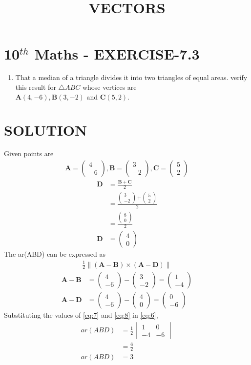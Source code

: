 \documentclass[12pt]{article}
\newcommand{\mydet}[1]{\ensuremath{\begin{vmatrix}#1\end{vmatrix}}}
\providecommand{\brak}[1]{\ensuremath{\left(#1\right)}}
\newcommand{\myvec}[1]{\ensuremath{\begin{pmatrix}#1\end{pmatrix}}}
\providecommand{\norm}[1]{\left\lVert#1\right\rVert}
\let\vec\mathbf
\begin{document}
\begin{center}
\title{\textbf{VECTORS}}
\date{\vspace{-5ex}} %
\maketitle
\end{center}

\section{10$^{th}$ Maths - EXERCISE-7.3}

\begin{enumerate}
\item That a median of a triangle divides it into two triangles  of equal areas. verify this result for $\triangle ABC$ whose vertices are $\vec{A}(4,-6),\vec{B}(3,-2)\text{ and }\vec{C}(5,2)$.
\end{enumerate}

\section{SOLUTION}
Given points are
\begin{align}
\vec{A}=\myvec{4\\ -6} ,
\vec{B}=\myvec{3\\ -2} ,
\vec{C}=\myvec{5\\ 2}
\end{align}
\begin{align}
\vec{D}&=\frac{\vec{B}+\vec{C}}{2}\\
&=\frac{\myvec{3\\ -2}+\myvec{5\\ 2}}{2}\\
&=\frac{\myvec{8\\ 0}}{2}\\
\vec{D}&=\myvec{4\\ 0}
\end{align}
The ar(ABD) can be expressed as
 \begin{align}
  \frac{1}{2} \norm{\brak{\vec{A}-\vec{B}}  \times 
   \brak{\vec{A}- \vec{D}}} \label{eq:6} 
\end{align}
\begin{align}
	\vec{A}- \vec{B} &= \myvec{4\\ -6}-\myvec{3\\ -2}=\myvec{1\\ -4}\label{eq:7}\\
	  \vec{A}- \vec{D} &= \myvec{4\\ -6}-\myvec{4\\ 0}=\myvec{0\\ -6}\label{eq:8}
  \end{align}
Substituting the values of \eqref{eq:7} and \eqref{eq:8} in \eqref{eq:6},
\begin{align}
	ar(ABD)&=\frac{1}{2}\mydet{1 & 0\\-4 & -6}\\  
	       &=	\frac{6}{2}\\
	ar(ABD)&=3
\end{align}
\end{document}
